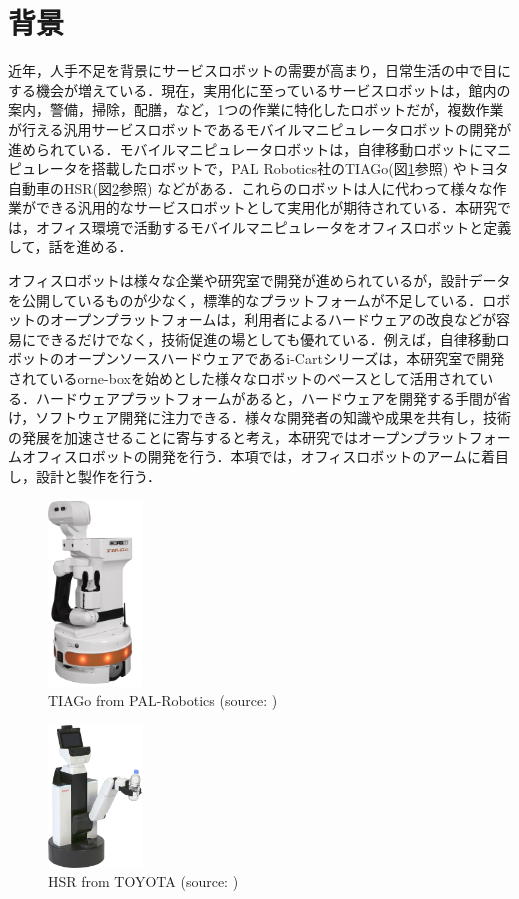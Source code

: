 
\section{背景}
近年，人手不足を背景にサービスロボットの需要が高まり，日常生活の中で目にする機会が増えている．現在，実用化に至っているサービスロボットは，館内の案内\cite{AYUDA:online}，警備\cite{SQ-2:online}，掃除\cite{KLEENBOT:online}，配膳\cite{BellaBot:online}，など，1つの作業に特化したロボットだが，複数作業が行える汎用サービスロボットであるモバイルマニピュレータロボットの開発が進められている．モバイルマニピュレータロボットは，自律移動ロボットにマニピュレータを搭載したロボットで，PAL Robotics社のTIAGo(図\ref{fig:TIAGo}参照) やトヨタ自動車のHSR(図\ref{fig:HSR}参照) などがある．これらのロボットは人に代わって様々な作業ができる汎用的なサービスロボットとして実用化が期待されている\cite{古賀達也201937_707}．本研究では，オフィス環境で活動するモバイルマニピュレータをオフィスロボットと定義して，話を進める．

オフィスロボットは様々な企業や研究室で開発が進められているが，設計データを公開しているものが少なく，標準的なプラットフォームが不足している．ロボットのオープンプラットフォームは，利用者によるハードウェアの改良などが容易にできるだけでなく，技術促進の場としても優れている．例えば，自律移動ロボットのオープンソースハードウェアであるi-Cartシリーズは，本研究室で開発されているorne-boxを始めとした様々なロボットのベースとして活用されている．ハードウェアプラットフォームがあると，ハードウェアを開発する手間が省け，ソフトウェア開発に注力できる．様々な開発者の知識や成果を共有し，技術の発展を加速させることに寄与すると考え，本研究ではオープンプラットフォームオフィスロボットの開発を行う．本項では，オフィスロボットのアームに着目し，設計と製作を行う．

\begin{figure}[h]
  \centering
  \includegraphics[width=25mm]{images/png/TIAGo.png}
  \caption{TIAGo from PAL-Robotics (source: \cite{TIAGo:online})}
  \label{fig:TIAGo}
\end{figure}
\begin{figure}[h]
  \centering
  \includegraphics[width=25mm]{images/png/HSR.png}
  \caption{HSR from TOYOTA (source: \cite{HSR:online})}
  \label{fig:HSR}
\end{figure}

\newpage